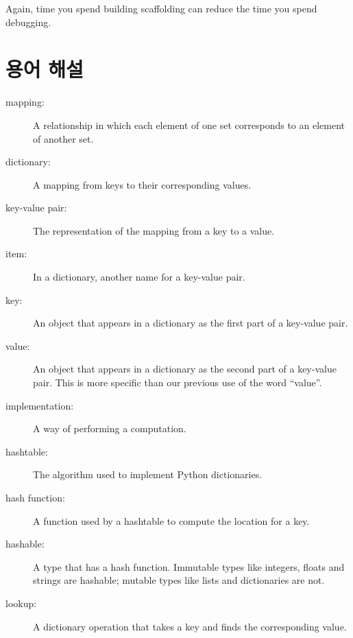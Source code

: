 \documentclass[10pt]{book}
\begin{document}
Again, time you spend building scaffolding can reduce
the time you spend debugging.


\section{용어 해설}

\begin{description}

\item[mapping:] A relationship in which each element of one set
corresponds to an element of another set.

\item[dictionary:] A mapping from keys to their
corresponding values.

\item[key-value pair:] The representation of the mapping from
a key to a value.

\item[item:] In a dictionary, another name for a key-value
  pair.

\item[key:] An object that appears in a dictionary as the
first part of a key-value pair.

\item[value:] An object that appears in a dictionary as the
second part of a key-value pair.  This is more specific than
our previous use of the word ``value''.

\item[implementation:] A way of performing a computation.

\item[hashtable:] The algorithm used to implement Python
dictionaries.

\item[hash function:] A function used by a hashtable to compute the
location for a key.

\item[hashable:] A type that has a hash function.  Immutable
types like integers,
floats and strings are hashable; mutable types like lists and
dictionaries are not.

\item[lookup:] A dictionary operation that takes a key and finds
the corresponding value.


\end{description}
\end{document}
